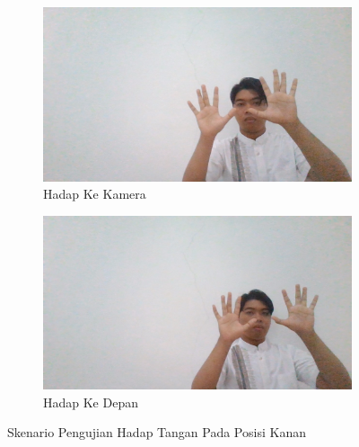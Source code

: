 \begin{enumerate}
  \begin{figure}[H]
    \centering
    \begin{subfigure}{0.7\textwidth}
      \centering
      \includegraphics[width=\linewidth]{../Gambar/KananHadapKamera.jpg}
      \caption{Hadap Ke Kamera}
      \label{fig:kananhadapkamera}
    \end{subfigure}
    \begin{subfigure}{0.7\textwidth}
      \centering
      \includegraphics[width=\linewidth]{../Gambar/KananHadapLurus.jpg}
      \caption{Hadap Ke Depan}
      \label{fig:kananhadaplurus}
    \end{subfigure}
    \centering
    \caption{Skenario Pengujian Hadap Tangan Pada Posisi Kanan}
    \label{fig:posisikanan}
  \end{figure}


\end{enumerate}
